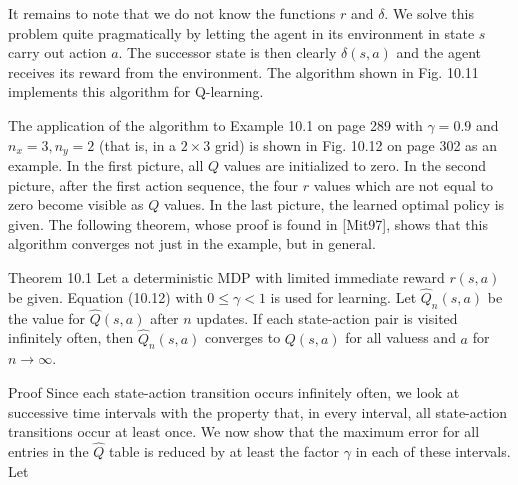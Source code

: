 \documentclass[10pt]{book}
\begin{document}
It remains to note that we do not know the functions $r$ and $\delta$. We solve this problem quite pragmatically by letting the agent in its environment in state $s$ carry out action $a$. The successor state is then clearly $\delta(s, a)$ and the agent receives its reward from the environment. The algorithm shown in Fig. 10.11 implements this algorithm for Q-learning.

The application of the algorithm to Example 10.1 on page 289 with $\gamma=0.9$ and $n_{x}=3, n_{y}=2$ (that is, in a $2 \times 3$ grid) is shown in Fig. 10.12 on page 302 as an example. In the first picture, all $Q$ values are initialized to zero. In the second picture, after the first action sequence, the four $r$ values which are not equal to zero become visible as $Q$ values. In the last picture, the learned optimal policy is given. The following theorem, whose proof is found in [Mit97], shows that this algorithm converges not just in the example, but in general.

\begin{displayquote}
Theorem 10.1 Let a deterministic MDP with limited immediate reward $r(s, a)$ be given. Equation (10.12) with $0 \leq \gamma<1$ is used for learning. Let $\hat{Q}_{n}(s, a)$ be the value for $\hat{Q}(s, a)$ after $n$ updates. If each state-action pair is visited infinitely often, then $\hat{Q}_{n}(s, a)$ converges to $Q(s, a)$ for all valuess and $a$ for $n \rightarrow \infty$.
\end{displayquote}

Proof Since each state-action transition occurs infinitely often, we look at successive time intervals with the property that, in every interval, all state-action transitions occur at least once. We now show that the maximum error for all entries in the $\hat{Q}$ table is reduced by at least the factor $\gamma$ in each of these intervals. Let
\end{document}
